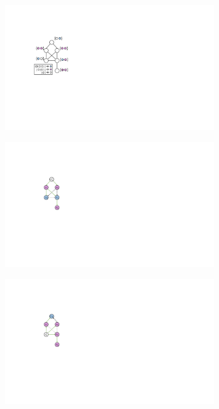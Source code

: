 \begin{figure}[t!]
\centering
\begin{subfigure}{.44\columnwidth}
\includegraphics[clip,width=\textwidth]{figures/bfc_1_new.pdf}
\subcaption{}
\label{subfig:bfc1}
\end{subfigure}%
\hfill
\begin{subfigure}{.25\columnwidth}
\includegraphics[clip,width=\textwidth]{figures/bfc_2_new.pdf}
\subcaption{}
\label{subfig:bfc2}
\end{subfigure}
\hfill
\begin{subfigure}{.25\columnwidth}
\includegraphics[clip,width=\textwidth]{figures/bfc_3_new.pdf}

\end{subfigure}
\end{figure}
